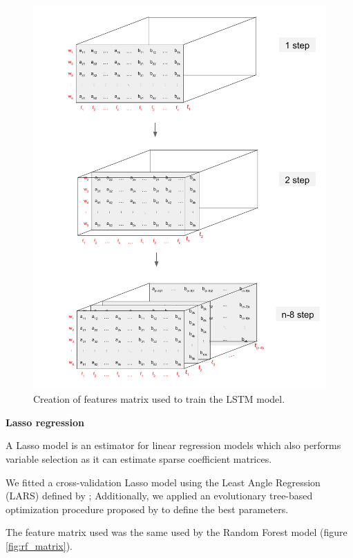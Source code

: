 \documentclass[12pt]{report}
\begin{document}
\begin{description}
\begin{figure}[!h]
\centering
\includegraphics[width = \textwidth]{lstm_matrix.pdf}
\caption{Creation of features matrix used to train the LSTM model.}
\label{fig:lstm_matrix}
\end{figure}

 \item \textbf{Lasso regression}
 
  A Lasso model is an estimator for linear regression models which also performs variable selection as it can estimate sparse coefficient matrices. 
  
  We fitted a cross-validation Lasso model using the Least Angle Regression (LARS) defined by \citet{efron2004least}; Additionally, we applied an evolutionary tree-based optimization procedure proposed by \citet{olson2016evaluation} to define the best parameters.
  
    The feature matrix used was the same used by the Random Forest model (figure \ref{fig:rf_matrix}).
  
\end{description}
\end{document}
